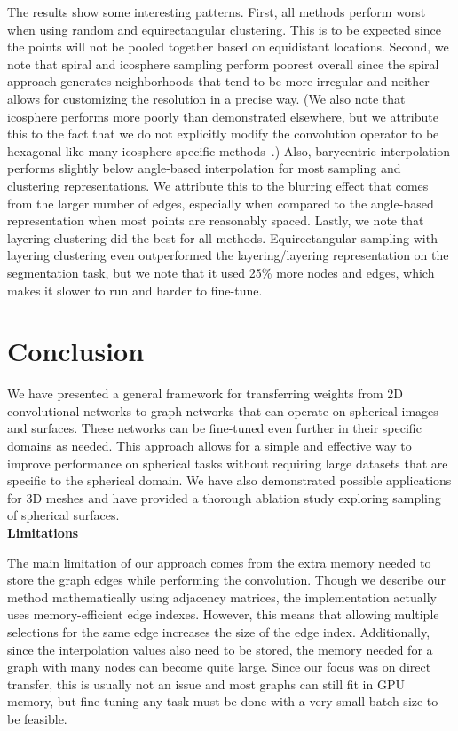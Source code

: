 \documentclass[10pt,twocolumn,letterpaper]{article}
\begin{document}
The results show some interesting patterns. First, all methods perform worst when using random and equirectangular clustering. This is to be expected since the points will not be pooled together based on equidistant locations. Second, we note that spiral and icosphere sampling perform poorest overall since the spiral approach generates neighborhoods that tend to be more irregular and neither allows for customizing the resolution in a precise way. (We also note that icosphere performs more poorly than demonstrated elsewhere, but we attribute this to the fact that we do not explicitly modify the convolution operator to be hexagonal like many icosphere-specific methods~\cite{Lee2019,Zhang2019}.) Also,  barycentric interpolation performs slightly below  angle-based interpolation for most sampling and clustering representations. We attribute this to the blurring effect that comes from the larger number of edges, especially when compared to the angle-based representation when most points are reasonably spaced. Lastly, we note that layering clustering did the best for all methods. Equirectangular sampling with layering clustering even outperformed the layering/layering representation on the segmentation task, but we note that it used 25\% more nodes and edges, which makes it slower to run and harder to fine-tune.






\section{Conclusion}

We have presented a general framework for transferring weights from 2D convolutional networks to graph networks that can operate on spherical images and surfaces. These networks can be fine-tuned even further in their specific domains as needed. This approach allows for a simple and effective way to improve performance on spherical tasks without requiring large datasets that are specific to the spherical domain. We have also demonstrated possible applications for 3D meshes and have provided a thorough ablation study exploring sampling of spherical surfaces. \\


\noindent \textbf{Limitations}

The main limitation of our approach comes from the extra memory needed to store the graph edges while performing the convolution. Though we describe our method mathematically using adjacency matrices, the implementation actually uses memory-efficient edge indexes. However, this means that allowing multiple selections for the same edge increases the size of the edge index. Additionally, since the interpolation values also need to be stored, the memory needed for a graph with many nodes can become quite large. Since our focus was on direct transfer, this is usually not an issue and most graphs can still fit in GPU memory, but fine-tuning any task must be done with a very small batch size to be feasible.
\end{document}
